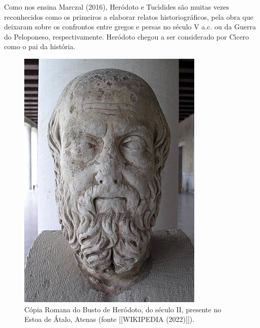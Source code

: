\documentclass[
12pt,		%
openright,	%
twoside,  %
a4paper,			%
chapter=TITLE,		%
english,			%
french,				%
spanish,			%
brazil				%
]{USPSC-classe/USPSC_RedarTex}
\begin{document}
Como nos ensina  Marczal (2016),  Her\'odoto e Tuc\'{\i}dides s\~ao muitas vezes reconhecidos como os primeiros a elaborar relatos historiogr\'aficos, pela obra que deixaram sobre os confrontos entre gregos e persas no s\'eculo V a.c. ou da Guerra do Peloponeso, respectivamente. Her\'odoto chegou a ser considerado por C\'{\i}cero como o \textquotedbl pai da hist\'oria\textquotedbl  [XXX].












\captionsetup{format=plain}
\begin{figure}[max size={\textwidth}{\textheight}]

\centering


\begin{minipage}[b]{0.4\linewidth}
        \centering
                \includegraphics[width=1.0\linewidth]{../../imagens/Herodote.jpg}
                \caption{C\'opia Romana do Busto de Her\'odoto, do s\'eculo II, presente no Estoa de \'Atalo, Atenas (fonte [[WIKIPEDIA (2022)]]).}
                \label{9f279b29e90288533caab6ba43668512f3a9eee4}
\end{minipage}%
\hspace{0.5cm}
\end{figure}
\end{document}
